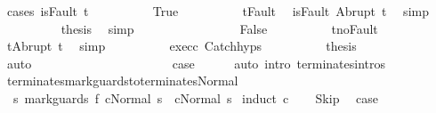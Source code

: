 \begin{isabellebody}
\ {\isacharparenleft}cases\ {\isachardoublequoteopen}isFault\ t{\isacharprime}{\isachardoublequoteclose}{\isacharparenright}\isanewline
\ \ \ \ \ \ \ \ \isamarkupfalse%
\ True\isanewline
\ \ \ \ \ \ \ \ \isamarkupfalse%
\ t{\isacharprime}{\isacharunderscore}Fault\ \isamarkupfalse%
\ {\isachardoublequoteopen}isFault\ {\isacharparenleft}Abrupt\ t{\isacharparenright}{\isachardoublequoteclose}\ \isamarkupfalse%
\ simp\isanewline
\ \ \ \ \ \ \ \ \isamarkupfalse%
\ {\isacharquery}thesis\ \isamarkupfalse%
\ simp\isanewline
\ \ \ \ \ \ \isamarkupfalse%
\isanewline
\ \ \ \ \ \ \ \ \isamarkupfalse%
\ False\isanewline
\ \ \ \ \ \ \ \ \isamarkupfalse%
\ t{\isacharprime}{\isacharunderscore}noFault\ \isamarkupfalse%
\ {\isachardoublequoteopen}t{\isacharprime}{\isacharequal}Abrupt\ t{\isachardoublequoteclose}\ \isamarkupfalse%
\ simp\isanewline
\ \ \ \ \ \ \ \ \isamarkupfalse%
\ exec{\isacharunderscore}c{}\ Catch{\isachardot}hyps\isanewline
\ \ \ \ \ \ \ \ \isamarkupfalse%
\ {\isacharquery}thesis\isanewline
\ \ \ \ \ \ \ \ \ \ \isamarkupfalse%
\ auto\isanewline
\ \ \ \ \ \ \isamarkupfalse%
\isanewline
\ \ \ \ \isamarkupfalse%
\ \ \isanewline
\ \ \isacommand{{\isacharbraceright}}\isamarkupfalse%
\isanewline
\ \ \isamarkupfalse%
\ \isamarkupfalse%
\ {\isacharquery}case\isanewline
\ \ \ \ \isamarkupfalse%
\ {\isacharparenleft}auto\ intro{\isacharcolon}\ terminates{\isachardot}intros{\isacharparenright}\isanewline
{}\isamarkupfalse%
%
\endisatagproof
{\isafoldproof}%
%
\isadelimproof
\isanewline
%
\endisadelimproof
\isanewline
{}\isamarkupfalse%
\ terminates{\isacharunderscore}mark{\isacharunderscore}guards{\isacharunderscore}to{\isacharunderscore}terminates{\isacharunderscore}Normal{\isacharcolon}\isanewline
\ \ {\isachardoublequoteopen}{\isasymAnd}s{\isachardot}\ {\isasymGamma}{\isasymturnstile}mark{\isacharunderscore}guards\ f\ c{\isasymdown}Normal\ s\ {\isasymLongrightarrow}\ {\isasymGamma}{\isasymturnstile}c{\isasymdown}Normal\ s{\isachardoublequoteclose}\isanewline
%
\isadelimproof
%
\endisadelimproof
%
\isatagproof
{}\isamarkupfalse%
\ {\isacharparenleft}induct\ c{\isacharparenright}\isanewline
\ \ \isamarkupfalse%
\ Skip\ \isamarkupfalse%
\ {\isacharquery}case\ \isamarkupfalse%

\end{isabellebody}
